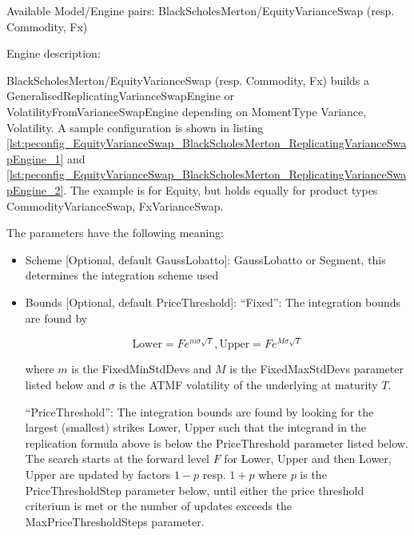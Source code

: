Available Model/Engine pairs: BlackScholesMerton/EquityVarianceSwap (resp. Commodity, Fx)

Engine description:

BlackScholesMerton/EquityVarianceSwap (resp. Commodity, Fx) builds a GeneralisedReplicatingVarianceSwapEngine or
VolatilityFromVarianceSwapEngine depending on MomentType Variance, Volatility. A sample configuration is shown in
listing \ref{lst:peconfig_EquityVarianceSwap_BlackScholesMerton_ReplicatingVarianceSwapEngine_1} and
\ref{lst:peconfig_EquityVarianceSwap_BlackScholesMerton_ReplicatingVarianceSwapEngine_2}. The example is for Equity, but
holds equally for product types CommodityVarianceSwap, FxVarianceSwap.

The parameters have the following meaning:

\begin{itemize}
\item Scheme [Optional, default GaussLobatto]: GaussLobatto or Segment, this determines the integration scheme used
\item Bounds [Optional, default PriceThreshold]: ``Fixed'': The integration bounds are found by

  $$
  \text{Lower} = F e ^ {m \sigma \sqrt{T}},  \text{Upper} = F e ^ {M \sigma \sqrt{T}}
  $$

  where $m$ is the FixedMinStdDevs and $M$ is the FixedMaxStdDevs parameter listed below and $\sigma$ is the ATMF
  volatility of the underlying at maturity $T$.

  ``PriceThreshold'': The integration bounds are found by looking for the largest (smallest) strikes Lower, Upper such
  that the integrand in the replication formula above is below the PriceThreshold parameter listed below. The search
  starts at the forward level $F$ for Lower, Upper and then Lower, Upper are updated by factors $1-p$ resp. $1+p$ where
  $p$ is the PriceThresholdStep parameter below, until either the price threshold criterium is met or the number of
  updates exceeds the MaxPriceThresholdSteps parameter.


\end{itemize}
